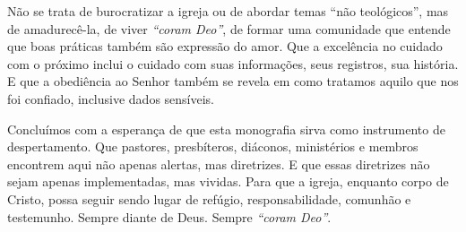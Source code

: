 Não se trata de burocratizar a igreja ou de abordar temas ``não teológicos'', mas de amadurecê-la, de viver \textit{``coram Deo''}, de formar uma comunidade que entende que boas práticas também são expressão do amor. Que a excelência no cuidado com o próximo inclui o cuidado com suas informações, seus registros, sua história. E que a obediência ao Senhor também se revela em como tratamos aquilo que nos foi confiado, inclusive dados sensíveis.

Concluímos com a esperança de que esta monografia sirva como instrumento de despertamento. Que pastores, presbíteros, diáconos, ministérios e membros encontrem aqui não apenas alertas, mas diretrizes. E que essas diretrizes não sejam apenas implementadas, mas vividas. Para que a igreja, enquanto corpo de Cristo, possa seguir sendo lugar de refúgio, responsabilidade, comunhão e testemunho. Sempre diante de Deus. Sempre \textit{``coram Deo''}.